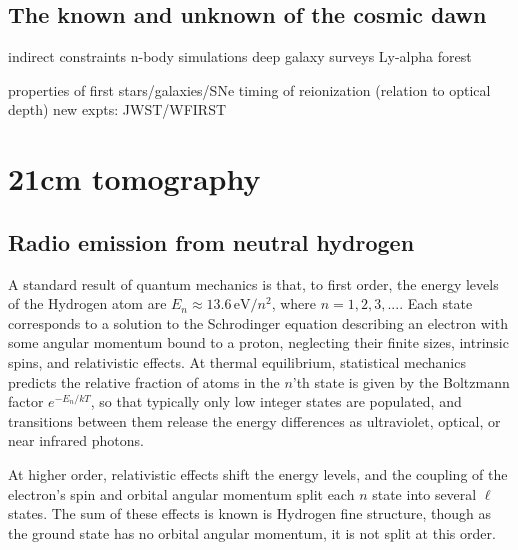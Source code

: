 \subsection{The known and unknown of the cosmic dawn}
indirect constraints
n-body simulations
deep galaxy surveys
 Ly-alpha forest
 
properties of first stars/galaxies/SNe
timing of reionization (relation to optical depth)
new expts: JWST/WFIRST

\section{21cm tomography}

\subsection{Radio emission from neutral hydrogen}

A standard result of quantum mechanics \citep[e.g.,][]{griffithsqm} is that, to first order, the energy levels of the Hydrogen atom are $E_n\approx13.6\,\text{eV}/n^2$, where $n=1,2,3,...$. Each state corresponds to a solution to the Schrodinger equation describing an electron with some angular momentum bound to a proton, neglecting their finite sizes, intrinsic spins, and relativistic effects. At thermal equilibrium, statistical mechanics predicts the relative fraction of atoms in the $n$'th state is given by the Boltzmann factor $e^{-E_n/kT}$, so that typically only low integer states are populated, and transitions between them release the energy differences as ultraviolet, optical, or near infrared photons. 

At higher order, relativistic effects shift the energy levels, and the coupling of the electron's spin and orbital angular momentum split each $n$ state into several $\ell$ states. The sum of these effects is known is Hydrogen fine structure, though as the ground state has no orbital angular momentum, it is not split at this order. 

